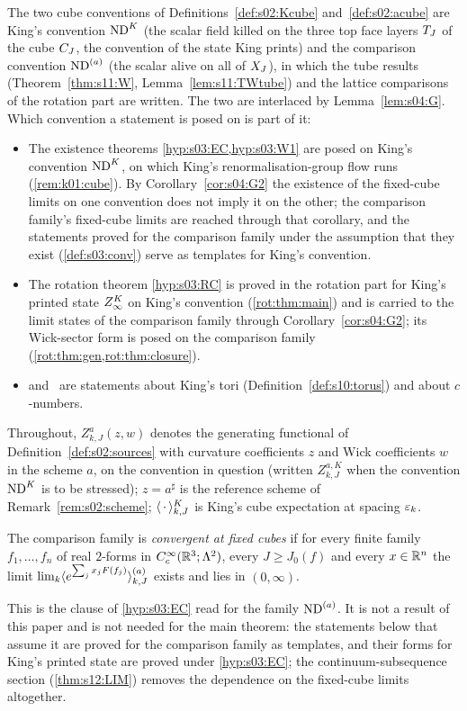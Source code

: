 The two cube conventions of Definitions~\ref{def:s02:Kcube} and~\ref{def:s02:acube} are King's convention $\mathrm{ND}^{K}$ (the scalar field killed on the three top face layers $T_J$ of the cube $C_J$, the convention of the state King prints) and the comparison convention $\mathrm{ND}^{(a)}$ (the scalar alive on all of $X_J$), in which the tube results (Theorem~\ref{thm:s11:W}, Lemma~\ref{lem:s11:TWtube}) and the lattice comparisons of the rotation part are written. The two are interlaced by Lemma~\ref{lem:s04:G}. Which convention a statement is posed on is part of it:
\begin{itemize}[leftmargin=2em]
\item The existence theorems \cref{hyp:s03:EC,hyp:s03:W1} are posed on King's convention $\mathrm{ND}^{K}$, on which King's renormalisation-group flow runs (\cref{rem:k01:cube}). By Corollary~\ref{cor:s04:G2} the existence of the fixed-cube limits on one convention does not imply it on the other; the comparison family's fixed-cube limits are reached through that corollary, and the statements proved for the comparison family under the assumption that they exist (\cref{def:s03:conv}) serve as templates for King's convention.
\item The rotation theorem \cref{hyp:s03:RC} is proved in the rotation part for King's printed state $Z^{K}_{\infty}$ on King's convention (\cref{rot:thm:main}) and is carried to the limit states of the comparison family through Corollary~\ref{cor:s04:G2}; its Wick-sector form is posed on the comparison family (\cref{rot:thm:gen,rot:thm:closure}).
\item {} and \Tthree\ are statements about King's tori (Definition~\ref{def:s10:torus}) and about $c$-numbers.
\end{itemize}
Throughout, $Z^{a}_{k,J}(z,w)$ denotes the generating functional of Definition~\ref{def:s02:sources} with curvature coefficients $z$ and Wick coefficients $w$ in the scheme $a$, on the convention in question (written $Z^{a,K}_{k,J}$ when the convention $\mathrm{ND}^{K}$ is to be stressed); $z=a^\sharp$ is the reference scheme of Remark~\ref{rem:s02:scheme}; $\langle \,\cdot\,\rangle^{K}_{k,J}$ is King's cube expectation at spacing $\varepsilon_k$.

\begin{definition}\label{def:s03:conv}
The comparison family is \emph{convergent at fixed cubes} if for every finite family $f_1,\dots,f_n$ of real $2$-forms in $C^\infty_c(\mathbb R^3;\Lambda^2)$, every $J\ge J_0(f)$ and every $x\in\mathbb R^n$ the limit $\lim_k\langle e^{\sum_jx_jF(f_j)}\rangle^{(a)}_{k,J}$ exists and lies in $(0,\infty)$.
\end{definition}
This is the clause of \cref{hyp:s03:EC} read for the family $\mathrm{ND}^{(a)}$. It is not a result of this paper and is not needed for the main theorem: the statements below that assume it are proved for the comparison family as templates, and their forms for King's printed state are proved under \cref{hyp:s03:EC}; the continuum-subsequence section (\cref{thm:s12:LIM}) removes the dependence on the fixed-cube limits altogether.

